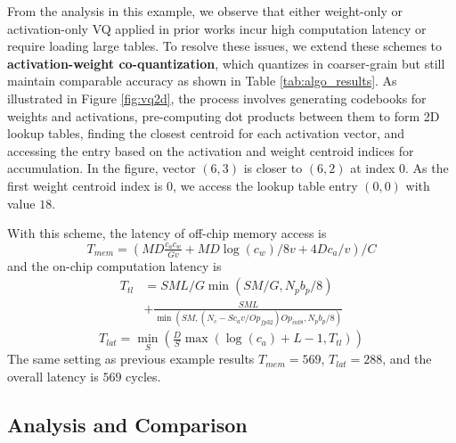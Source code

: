 \documentclass[conference]{IEEEtran}
\begin{document}
From the analysis in this example, we observe that either weight-only or activation-only VQ applied in prior works \cite{van2024gptvq, tang2023lut} incur high computation latency or require loading large tables. To resolve these issues, we extend these schemes to \textbf{activation-weight co-quantization}, which quantizes in coarser-grain but still maintain comparable accuracy as shown in Table \ref{tab:algo_results}. As illustrated in Figure \ref{fig:vq2d}, the process involves  generating codebooks for weights and activations,  pre-computing dot products between them to form 2D lookup tables,  finding the closest centroid for each activation vector, and  accessing the entry based on the activation and weight centroid indices for accumulation. In the figure, vector $(6,3)$ is closer to $(6,2)$ at index 0. As the first weight centroid index is 0, we access the lookup table entry $(0,0)$ with value $18$.

With this scheme, the latency of off-chip memory access is 
\begin{equation} \label{eq:2d_mem}
    T_{mem} = (MD\tfrac{c_ac_w}{Gv} + MD\log(c_w)/8v + 4Dc_a/v)/C
\end{equation}
and the on-chip computation latency is
\begin{equation}
    \begin{split}
    T_{tl} &= SML/G\min(SM/G, N_{p}b_{p}/8) \\
        &+ \frac{SML}{\min(SM, (N_{c} - Sc_av/Op_{fp32})Op_{int8}, N_pb_p/8)}
    \end{split}
\end{equation}
\begin{equation} \label{eq:2d_lat}
    T_{lat} = \min_{S}(\tfrac{D}{S} \max(\log(c_a)+L-1, T_{tl}))
\end{equation}
The same setting as previous example results $T_{mem} = 569$, $T_{lat} = 288$, and the overall latency is $569$ cycles.

\subsection{Analysis and Comparison}
\end{document}
